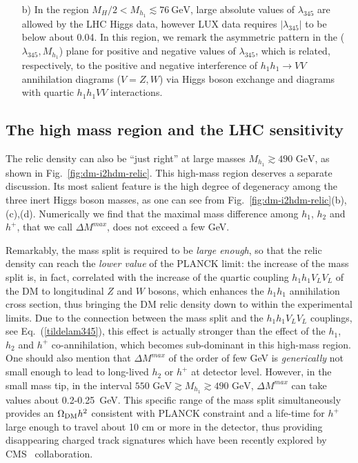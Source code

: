 \begin{itemize}
\item[b)] In the region $M_H/2<  M_{h_1} \lesssim 76~\mbox{GeV}$,  
large absolute values of  $\lambda_{345}$ are allowed by the LHC Higgs data, however LUX data requires $|\lambda_{345}|$ to be below about 0.04.
In this region, we remark the asymmetric pattern in the ($\lambda_{345},M_{h_1}$) plane
for positive and negative values of $\lambda_{345}$, which is related, respectively, to the 
positive and negative interference of  $h_1 h_1 \to VV$ annihilation diagrams ($V=Z,W$) via Higgs boson exchange
and diagrams with quartic $h_1 h_1 V V$  interactions. 
\end{itemize}

\subsection{The high mass region and the LHC sensitivity}

The relic density can also be ``just right'' at large masses $M_{h_1}\gtrsim 490\mbox{ GeV}$, as shown in Fig.~\ref{fig:dm-i2hdm-relic}. 
This high-mass region deserves a separate discussion. 
Its most salient feature is the high degree of degeneracy among the three inert Higgs boson masses, 
as one can see from Fig.~\ref{fig:dm-i2hdm-relic}(b),(c),(d). Numerically we find that the
maximal mass difference among $h_1$, $h_2$ and $h^+$, that we call $\Delta M^{max}$, does not exceed a few GeV. 

Remarkably, the mass split is required to be {\it large enough}, so that the relic density can reach the {\it lower value} of the PLANCK limit: the increase of  the mass
split is, in fact, correlated with the increase of the quartic coupling $h_1 h_1 V_L V_L$ of the DM to longitudinal $Z$ and $W$ bosons,
which enhances the $h_1 h_1$ annihilation cross section, thus bringing
the DM relic density down to within the experimental limits. Due to the connection between the mass split and the $h_1 h_1 V_L V_L$ couplings, 
see Eq.~(\ref{tildelam345}),
this effect is actually stronger than the effect of the
$h_1$, $h_2$ and $h^+$ co-annihilation, which becomes sub-dominant in this high-mass region.
One should also mention that  $\Delta M^{max}$ of the order of few GeV  is {\it generically} not 
small enough to lead to long-lived $h_2$ or $h^+$ at detector level.
However, in the small mass tip, in the interval
$550\mbox{ GeV} \gtrsim M_{h_1}\gtrsim 490\mbox{ GeV}$,  $\Delta M^{max}$ can take values 
about 0.2-0.25~GeV. This specific range of the mass split simultaneously provides an $\Omega_{\rm DM} h^2$ consistent with 
PLANCK constraint and a life-time for $h^+$ large enough to travel about 10 cm or more in the  detector, thus
providing disappearing charged track signatures which have been recently explored  by  CMS~\cite{CMS:2014gxa}
collaboration.

